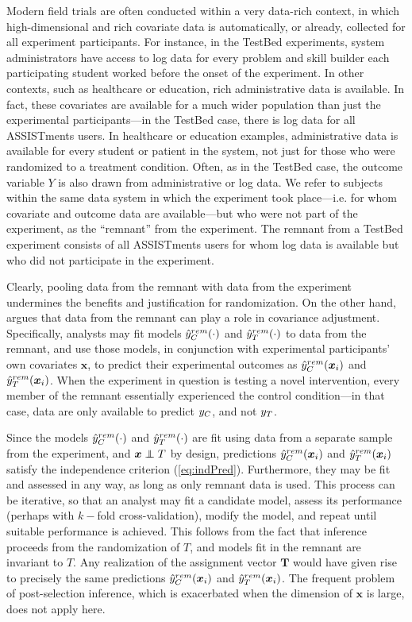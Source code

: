 Modern field trials are often conducted within a very data-rich
context, in which high-dimensional and rich covariate data is
automatically, or already, collected for all experiment participants.
For instance, in the TestBed experiments, system administrators have
access to log data for every problem and skill builder each
participating student worked before the onset of the experiment.
In other contexts, such as healthcare or education, rich
administrative data is available.
In fact, these covariates are available for a much wider population
than just the experimental participants---in the TestBed case, there
is log data for all ASSISTments users.
In healthcare or education examples, administrative data is available
for every student or patient in the system, not just for those who
were randomized to a treatment condition.
Often, as in the TestBed case, the outcome variable $Y$ is also drawn from administrative or
log data.
We refer to subjects within the same data system in which the
experiment took place---i.e. for whom covariate and outcome data are
available---but who were not part of the experiment, as the ``remnant'' from the experiment.
The remnant from a TestBed experiment consists of all ASSISTments
users for whom log data is available but who did not participate in
the experiment.

Clearly, pooling data from the remnant with data from the experiment
undermines the benefits and justification for randomization.
On the other hand, \citet{rebarEDM} argues that data from the remnant
can play a role in covariance adjustment.
Specifically, analysts may fit models $\hat{y}_C^{rem}(\cdot)$ and $\hat{y}_T^{rem}(\cdot)$ to data
from the remnant, and use those models, in conjunction with
experimental participants' own covariates $\bm{x}$, to predict their
experimental outcomes as $\hat{y}_C^{rem}(\bm{x}_i)$ and $\hat{y}_T^{rem}(\bm{x}_i)$.%
When the experiment in question is testing a novel intervention, every
member of the remnant essentially experienced the control
condition---in that case, data are only available to predict $y_C$,
and not $y_T$.

Since the models $\hat{y}_C^{rem}(\cdot) $ and $\hat{y}_T^{rem}(\cdot) $ are fit using data from a
separate sample from the experiment, and $\bm{x}\independent T$ by
design, predictions $\hat{y}_C^{rem}(\bm{x}_i) $ and $\hat{y}_T^{rem}(\bm{x}_i) $ satisfy the
independence criterion (\ref{eq:indPred}).
Furthermore, they may be fit and assessed in any way, as
long as only remnant data is used.
This process can be iterative, so that an analyst may fit a candidate
model, assess its performance (perhaps with $k-$fold
cross-validation), modify the model, and repeat until suitable
performance is achieved.
This follows from the fact that inference proceeds from the
randomization of $T$, and models fit in the remnant are invariant to
$T$.
Any realization of the assignment vector $\bm{T}$ would have given
rise to precisely the same predictions $\hat{y}_C^{rem}(\bm{x}_i) $ and $\hat{y}_T^{rem}(\bm{x}_i) $.
The frequent problem of post-selection inference, which is exacerbated
when the dimension of $\bm{x}$ is large, does not apply here.


